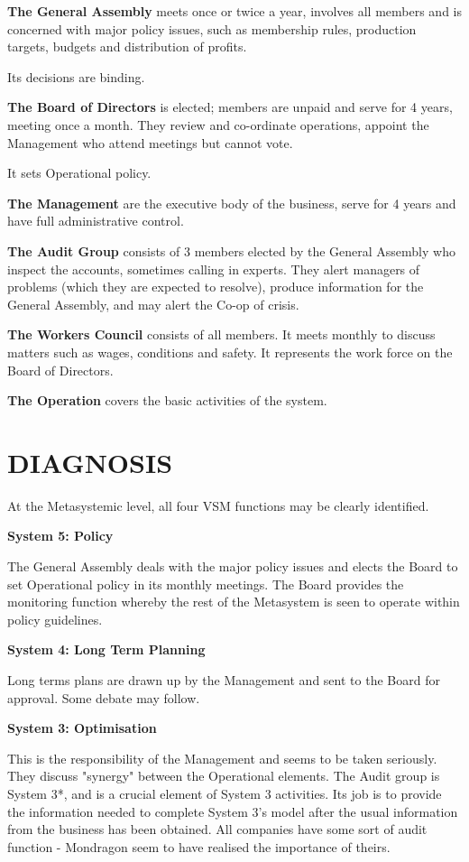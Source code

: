 \textbf{The General Assembly} meets once or twice a year, involves all members and is concerned with major policy issues, such as membership rules, production targets, budgets and distribution of profits.

Its decisions are binding.

\textbf{The Board of Directors} is elected; members are unpaid and serve for 4 years, meeting once a month. They review and co-ordinate operations, appoint the Management who attend meetings but cannot vote.

It sets Operational policy.

\textbf{The Management} are the executive body of the business, serve for 4 years and have full administrative control.

\textbf{The Audit Group} consists of 3 members elected by the General Assembly who inspect the accounts, sometimes calling in experts. They alert managers of problems (which they are expected to resolve), produce information for the General Assembly, and may alert the Co-op of crisis.

\textbf{The Workers Council} consists of all members. It meets monthly to discuss matters such as wages, conditions and safety. It represents the work force on the Board of Directors.

\textbf{The Operation} covers the basic activities of the system.

\section*{DIAGNOSIS}
At the Metasystemic level, all four VSM functions may be clearly identified.

\textbf{System 5: Policy}

The General Assembly deals with the major policy issues and elects the Board to set Operational policy in its monthly meetings. The Board provides the monitoring function whereby the rest of the Metasystem is seen to operate within policy guidelines.

\textbf{System 4: Long Term Planning}

Long terms plans are drawn up by the Management and sent to the Board for approval. Some debate may follow.

\textbf{System 3: Optimisation}

This is the responsibility of the Management and seems to be taken seriously. They discuss "synergy" between the Operational elements. The Audit group is System 3*, and is a crucial element of System 3 activities. Its job is to provide the information needed to complete System 3's model after the usual information from the business has been obtained. All companies have some sort of audit function - Mondragon seem to have realised the importance of theirs.

